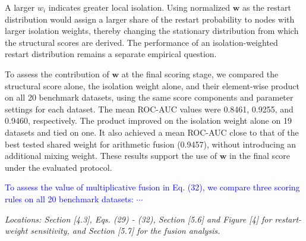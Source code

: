 \documentclass{ar2rc}
\begin{document}
{A larger \(w_i\) indicates greater local isolation. Using normalized \(\boldsymbol w\) as the restart distribution would assign a larger share of the restart probability to nodes with larger isolation weights, thereby changing the stationary distribution from which the structural scores are derived. The performance of an isolation-weighted restart distribution remains a separate empirical question.

To assess the contribution of \(\boldsymbol w\) at the final scoring stage, we compared the structural score alone, the isolation weight alone, and their element-wise product on all 20 benchmark datasets, using the same score components and parameter settings for each dataset. The mean ROC-AUC values were 0.8461, 0.9255, and 0.9460, respectively. The product improved on the isolation weight alone on 19 datasets and tied on one. It also achieved a mean ROC-AUC close to that of the best tested shared weight for arithmetic fusion (0.9457), without introducing an additional mixing weight. These results support the use of \(\boldsymbol w\) in the final score under the evaluated protocol.

\textcolor{blue}{
To assess the value of multiplicative fusion in Eq. (32), we compare three scoring rules on all 20 benchmark datasets: $\cdots$}

\textit{Locations: Section [4.3], Eqs. (29) - (32), Section [5.6] and Figure [4] for restart-weight sensitivity, and Section [5.7] for the fusion analysis.}
}
\end{document}

